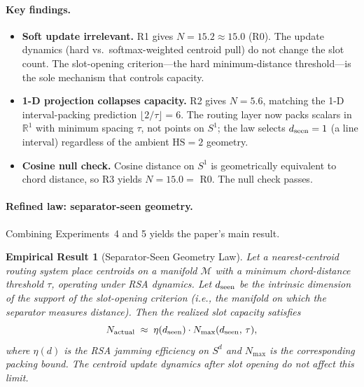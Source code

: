 \documentclass[11pt]{article}
\newtheorem{result}[theorem]{Empirical Result}
\begin{document}
\paragraph{Key findings.}
\begin{itemize}
  \item \textbf{Soft update irrelevant.} R1 gives $N = 15.2 \approx 15.0$ (R0).
    The update dynamics (hard vs.\ softmax-weighted centroid pull) do not change
    the slot count.
    The slot-opening criterion---the hard minimum-distance threshold---is the
    sole mechanism that controls capacity.
  \item \textbf{1-D projection collapses capacity.} R2 gives $N = 5.6$, matching
    the 1-D interval-packing prediction $\lfloor 2/\tau \rfloor = 6$.
    The routing layer now packs scalars in $\mathbb{R}^1$ with minimum spacing
    $\tau$, not points on $S^1$; the law selects $d_{\rm seen}=1$ (a line interval)
    regardless of the ambient $\mathrm{HS}=2$ geometry.
  \item \textbf{Cosine null check.} Cosine distance on $S^1$ is geometrically
    equivalent to chord distance, so R3 yields $N = 15.0 = $ R0. The null check
    passes.
\end{itemize}

\paragraph{Refined law: separator-seen geometry.}
Combining Experiments~4 and 5 yields the paper's main result.

\begin{result}[Separator-Seen Geometry Law]
\label{thm:main}
Let a nearest-centroid routing system place centroids on a manifold $\mathcal{M}$
with a minimum chord-distance threshold $\tau$, operating under RSA dynamics.
Let $d_{\rm seen}$ be the intrinsic dimension of the support of the slot-opening
criterion (i.e., the manifold on which the separator measures distance).
Then the realized slot capacity satisfies
\begin{equation}
  N_{\rm actual} \;\approx\; \eta(d_{\rm seen})\cdot N_{\max}(d_{\rm seen},\,\tau),
  \label{eq:dseen_law}
\end{equation}
where $\eta(d)$ is the RSA jamming efficiency on $S^d$ and $N_{\max}$ is the
corresponding packing bound.
The centroid update dynamics after slot opening do not affect this limit.
\end{result}
\end{document}

